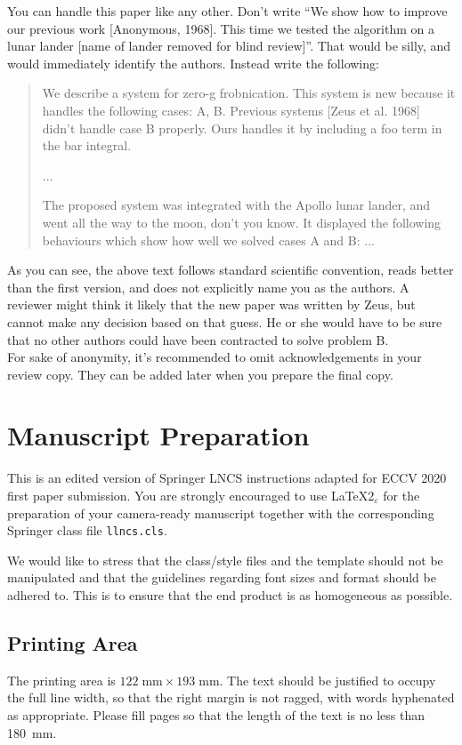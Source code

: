 \documentclass[runningheads]{llncs}
\begin{document}
You can handle this paper like any other.  Don't write ``We show how to
improve our previous work [Anonymous, 1968].  This time we tested the
algorithm on a lunar lander [name of lander removed for blind review]''.
That would be silly, and would immediately identify the authors. Instead
write the following:
\begin{quotation}
\noindent
   We describe a system for zero-g frobnication.  This
   system is new because it handles the following cases:
   A, B.  Previous systems [Zeus et al. 1968] didn't
   handle case B properly.  Ours handles it by including
   a foo term in the bar integral.

   ...

   The proposed system was integrated with the Apollo
   lunar lander, and went all the way to the moon, don't
   you know.  It displayed the following behaviours
   which show how well we solved cases A and B: ...
\end{quotation}
As you can see, the above text follows standard scientific convention,
reads better than the first version, and does not explicitly name you as
the authors.  A reviewer might think it likely that the new paper was
written by Zeus, but cannot make any decision based on that guess.
He or she would have to be sure that no other authors could have been
contracted to solve problem B. \\

For sake of anonymity, it's recommended to omit acknowledgements
in your review copy. They can be added later when you prepare the final copy.

\section{Manuscript Preparation}

This is an edited version of Springer LNCS instructions adapted
for ECCV 2020 first paper submission.
You are strongly encouraged to use \LaTeX2$_\varepsilon$ for the
preparation of your
camera-ready manuscript together with the corresponding Springer
class file \verb+llncs.cls+.

We would like to stress that the class/style files and the template
should not be manipulated and that the guidelines regarding font sizes
and format should be adhered to. This is to ensure that the end product
is as homogeneous as possible.

\subsection{Printing Area}
The printing area is $122  \; \mbox{mm} \times 193 \;
\mbox{mm}$.
The text should be justified to occupy the full line width,
so that the right margin is not ragged, with words hyphenated as
appropriate. Please fill pages so that the length of the text
is no less than 180~mm.
\end{document}
